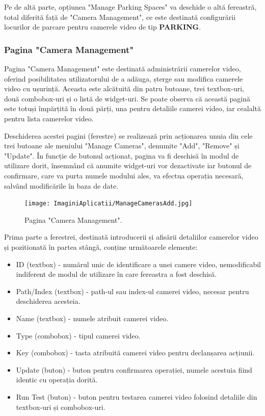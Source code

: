 \documentclass[12pt]{article}
\begin{document}
Pe de alt\u{a} parte, opțiunea "Manage Parking Spaces" va deschide o alt\u{a} fereastr\u{a}, total diferit\u{a} faț\u{a} de "Camera Management", ce este destinat\u{a} configur\u{a}rii locurilor de parcare pentru camerele video de tip \textbf{PARKING}.

\subsubsection{Pagina "Camera Management"}

Pagina "Camera Management" este destinat\u{a} administr\u{a}rii camerelor video, oferind posibilitatea utilizatorului de a ad\u{a}uga, șterge sau modifica camerele video cu ușurinț\u{a}. Aceasta este alc\u{a}tuit\u{a} din patru butoane, trei textbox-uri, dou\u{a} combobox-uri și o list\u{a} de widget-uri. Se poate observa c\u{a} aceast\u{a} pagin\u{a} este totuși \^{i}mp\u{a}rțit\u{a} \^{i}n dou\u{a} p\u{a}rți, una pentru detaliile camerei video, iar cealalt\u{a} pentru lista camerelor video.

Deschiderea acestei pagini (ferestre) se realizeaz\u{a} prin acționarea unuia din cele trei butoane ale meniului "Manage Cameras", denumite "Add", "Remove" și "Update". \^{I}n funcție de butonul acționat, pagina va fi deschis\u{a} \^{i}n modul de utilizare dorit, \^{i}nsemn\^{a}nd c\u{a} anumite widget-uri vor dezactivate iar butonul de confirmare, care va purta numele modului ales, va efectua operația necesar\u{a}, salv\^{a}nd modific\u{a}rile \^{i}n baza de date.

\begin{figure}[H]
  \centering
  \texttt{[image: ImaginiAplicatii/ManageCamerasAdd.jpg]}
  \caption{Pagina "Camera Management".}
  \label{fig:aplicatie_pagina_camera_management}
\end{figure}

Prima parte a ferestrei, destinat\u{a} introducerii și afis\u{a}rii detaliilor camerelor video și pozitionat\u{a} \^{i}n partea st\^{a}ng\u{a}, conține urm\u{a}toarele elemente: 

\begin{itemize}
    \item ID (textbox) - num\u{a}rul unic de identificare a unei camere video, nemodificabil indiferent de modul de utilizare \^{i}n care fereastra a fost deschis\u{a}.
    \item Path/Index (textbox) - path-ul sau index-ul camerei video, necesar pentru deschiderea acesteia.
    \item Name (textbox) - numele atribuit camerei video.
    \item Type (combobox) - tipul camerei video.
    \item Key (combobox) - tasta atribuit\u{a} camerei video pentru declanșarea acțiunii.
    \item Update (buton) - buton pentru confirmarea operației, numele acestuia fiind identic cu operația dorit\u{a}.
    \item Run Test (buton) - buton pentru testarea camerei video folosind detaliile din textbox-uri și combobox-uri.
\end{itemize}
\end{document}
